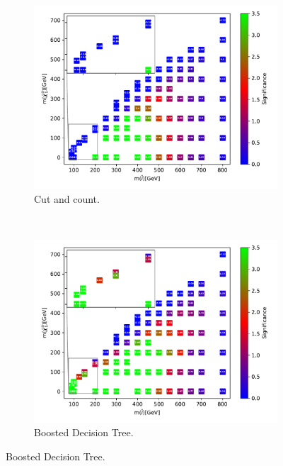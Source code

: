 \begin{figure}[H]
    \centering
    \begin{subfigure}[t!]{0.49\textwidth}
    \includegraphics[width = \textwidth]{Figures/Significances/significanceCutandCount_slepslep_all.pdf}
    \caption{Cut and count.}
        \label{fig:signAllSlepSlepcandc}
    \end{subfigure}
    \\
    \begin{subfigure}[t!]{0.49\textwidth}
    \includegraphics[width = \textwidth]{Figures/Significances/significance_BDT_slepslep_All_level.pdf}
    \caption{Boosted Decision Tree.}
        \label{fig:signAllSlepSlepBDT}
    \end{subfigure}      

\end{figure}
